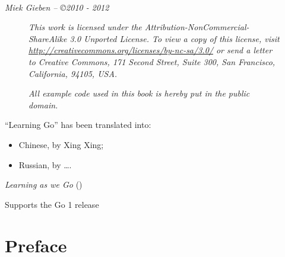 \documentclass[a4paper,twoside,openleft]{blocksbook}
\begin{document}
\vfill
\begin{center}
    \hspace*{1cm}\\[2.5ex]
    \hspace*{1cm}{\tiny\CcNote{\CcLongnameByNcSa}}
\end{center}
\begin{center}
\hspace*{1cm}\emph{Miek Gieben -- \copyright 2010 - 2012}
\end{center}
\vspace{-3em}

\newpage

\thispagestyle{empty}
\begin{figure}[H]
\begin{center}
\emph{
This work is licensed under the Attribution-NonCommercial-ShareAlike 3.0 Unported License. To
view a copy of this license, visit \url{http://creativecommons.org/licenses/by-nc-sa/3.0/} 
or send a letter
to Creative Commons, 171 Second Street, Suite 300, San Francisco, California, 94105, USA.}
\vspace{2em}

\emph{All example code used in this book is hereby put in the public domain.}
\end{center}

\end{figure}

\begin{center}
``Learning Go'' has been translated into:
\begin{itemize}
\item Chinese, by Xing Xing;
\item Russian, by \ldots.
\end{itemize}
\end{center}

\begin{center}
\vfill
\emph{Learning as we Go}
(\emph{\version})

\tiny{Supports the Go 1 release}
\vspace{.2\stockheight}
\end{center}

\clearpage

\tableofcontents*
\listoffigures*
\listofcode* 
\listofex* 
\clearpage

\chapter*{Preface}
\label{chap:preface}

\end{document}
